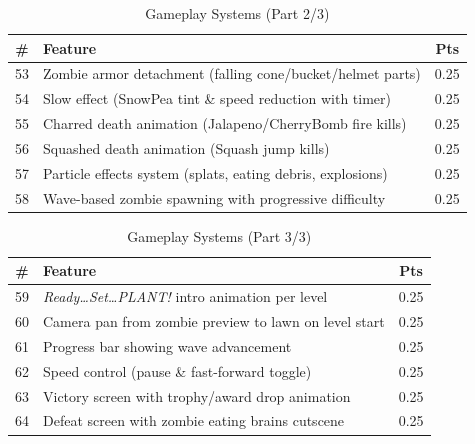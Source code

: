 \documentclass[12pt,a4paper]{article}
\begin{document}
\begin{table}[htbp]
\centering
\tiny
\begin{tabular}{clc}
\toprule
\textbf{\#} & \textbf{Feature} & \textbf{Pts} \\
\midrule
53 & Zombie armor detachment (falling cone/bucket/helmet parts) & 0.25 \\
54 & Slow effect (SnowPea tint \& speed reduction with timer) & 0.25 \\
55 & Charred death animation (Jalapeno/CherryBomb fire kills) & 0.25 \\
56 & Squashed death animation (Squash jump kills) & 0.25 \\
57 & Particle effects system (splats, eating debris, explosions) & 0.25 \\
58 & Wave-based zombie spawning with progressive difficulty & 0.25 \\
\bottomrule
\end{tabular}
\caption{Gameplay Systems (Part 2/3)}
\end{table}

\begin{table}[htbp]
\centering
\tiny
\begin{tabular}{clc}
\toprule
\textbf{\#} & \textbf{Feature} & \textbf{Pts} \\
\midrule
59 & \emph{Ready\ldots Set\ldots PLANT!} intro animation per level & 0.25 \\
60 & Camera pan from zombie preview to lawn on level start & 0.25 \\
61 & Progress bar showing wave advancement & 0.25 \\
62 & Speed control (pause \& fast-forward toggle) & 0.25 \\
63 & Victory screen with trophy/award drop animation & 0.25 \\
64 & Defeat screen with zombie eating brains cutscene & 0.25 \\
\bottomrule
\end{tabular}
\caption{Gameplay Systems (Part 3/3)}
\end{table}
\end{document}

